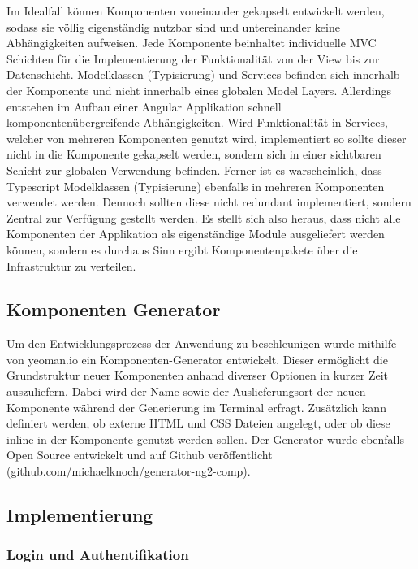 Im Idealfall können Komponenten voneinander gekapselt entwickelt werden,
sodass sie völlig eigenständig nutzbar sind und untereinander keine Abhängigkeiten aufweisen.
Jede Komponente beinhaltet individuelle \ac{MVC} Schichten für die Implementierung der Funktionalität von der View bis zur Datenschicht.
Modelklassen (Typisierung) und Services befinden sich innerhalb der Komponente und nicht innerhalb eines globalen Model Layers.
Allerdings entstehen im Aufbau einer Angular Applikation schnell komponentenübergreifende Abhängigkeiten.
Wird Funktionalität in Services, welcher von mehreren Komponenten genutzt wird, implementiert
so sollte dieser nicht in die Komponente gekapselt werden, sondern sich in einer sichtbaren Schicht zur globalen Verwendung befinden.
Ferner ist es warscheinlich, dass Typescript Modelklassen (Typisierung) ebenfalls in mehreren Komponenten verwendet werden.
Dennoch sollten diese nicht redundant implementiert,
sondern Zentral zur Verfügung gestellt werden. Es stellt sich also heraus,
dass nicht alle Komponenten der Applikation \projectname{} als eigenständige Module ausgeliefert werden können,
sondern es durchaus Sinn ergibt Komponentenpakete über die Infrastruktur zu verteilen.


\subsection{Komponenten Generator}

Um den Entwicklungsprozess der Anwendung zu beschleunigen wurde mithilfe von yeoman.io ein Komponenten-Generator entwickelt.
Dieser ermöglicht die Grundstruktur neuer Komponenten anhand diverser Optionen in kurzer Zeit auszuliefern.
Dabei wird der Name sowie der Auslieferungsort der neuen Komponente während der Generierung im Terminal erfragt.
Zusätzlich kann definiert werden, ob externe \ac{HTML} und \ac{CSS} Dateien angelegt, oder ob diese inline in der Komponente genutzt werden sollen.
Der Generator wurde ebenfalls Open Source entwickelt und auf Github veröffentlicht
(github.com/michaelknoch/generator-ng2-comp).

\subsection{Implementierung}


\subsubsection{Login und Authentifikation}
\label{Login-und-Authentifikation}

